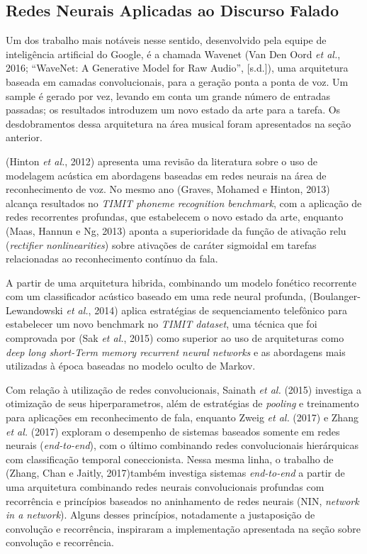 \documentclass[]{article}
\begin{document}
\hypertarget{redes-neurais-aplicadas-ao-discurso-falado}{%
\subsection{Redes Neurais Aplicadas ao Discurso
Falado}\label{redes-neurais-aplicadas-ao-discurso-falado}}

Um dos trabalho mais notáveis nesse sentido, desenvolvido pela equipe de
inteligência artificial do Google, é a chamada Wavenet (Van Den Oord
\emph{et al.}, 2016; ``WaveNet: A Generative Model for Raw Audio'',
{[}s.d.{]}), uma arquitetura baseada em camadas convolucionais, para a
geração ponta a ponta de voz. Um sample é gerado por vez, levando em
conta um grande número de entradas passadas; os resultados introduzem um
novo estado da arte para a tarefa. Os desdobramentos dessa arquitetura
na área musical foram apresentados na seção anterior.

(Hinton \emph{et al.}, 2012) apresenta uma revisão da literatura sobre o
uso de modelagem acústica em abordagens baseadas em redes neurais na
área de reconhecimento de voz. No mesmo ano (Graves, Mohamed e Hinton,
2013) alcança resultados no \emph{TIMIT phoneme recognition benchmark},
com a aplicação de redes recorrentes profundas, que estabelecem o novo
estado da arte, enquanto (Maas, Hannun e Ng, 2013) aponta a
superioridade da função de ativação relu (\emph{rectifier
nonlinearities}) sobre ativações de caráter sigmoidal em tarefas
relacionadas ao reconhecimento contínuo da fala.

A partir de uma arquitetura hibrida, combinando um modelo fonético
recorrente com um classificador acústico baseado em uma rede neural
profunda, (Boulanger-Lewandowski \emph{et al.}, 2014) aplica estratégias
de sequenciamento telefônico para estabelecer um novo benchmark no
\emph{TIMIT dataset}, uma técnica que foi comprovada por (Sak \emph{et
al.}, 2015) como superior ao uso de arquiteturas como \emph{deep long
short-Term memory recurrent neural networks} e as abordagens mais
utilizadas à época baseadas no modelo oculto de Markov.

Com relação à utilização de redes convolucionais, Sainath \emph{et al.}
(2015) investiga a otimização de seus hiperparametros, além de
estratégias de \emph{pooling} e treinamento para aplicações em
reconhecimento de fala, enquanto Zweig \emph{et al.} (2017) e Zhang
\emph{et al.} (2017) exploram o desempenho de sistemas baseados somente
em redes neurais (\emph{end-to-end}), com o último combinando redes
convolucionais hierárquicas com classificação temporal coneccionista.
Nessa mesma linha, o trabalho de (Zhang, Chan e Jaitly, 2017)também
investiga sistemas \emph{end-to-end} a partir de uma arquitetura
combinando redes neurais convolucionais profundas com recorrência e
princípios baseados no aninhamento de redes neurais (NIN, \emph{network
in a network}). Alguns desses princípios, notadamente a justaposição de
convolução e recorrência, inspiraram a implementação apresentada na
seção sobre convolução e recorrência.
\end{document}
